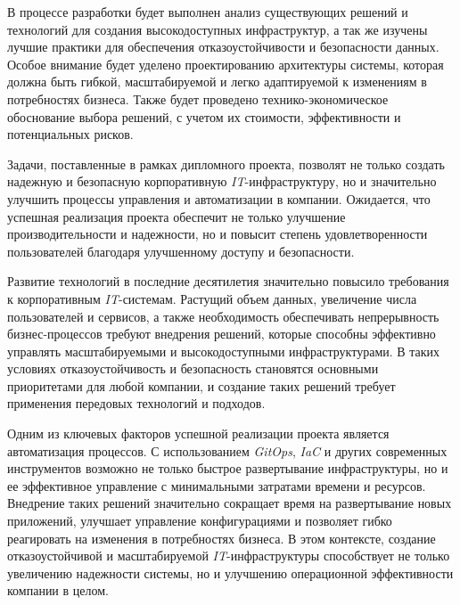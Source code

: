 В процессе разработки будет выполнен анализ существующих решений и технологий для создания высокодоступных инфраструктур, а так же изучены лучшие практики для обеспечения отказоустойчивости и безопасности данных. Особое внимание будет уделено проектированию архитектуры системы, которая должна быть гибкой, масштабируемой и легко адаптируемой к изменениям в потребностях бизнеса. Также будет проведено технико-экономическое обоснование выбора решений, с учетом их стоимости, эффективности и потенциальных рисков.

Задачи, поставленные в рамках дипломного проекта, позволят не только создать надежную и безопасную корпоративную \textit{IT}-инфраструктуру, но и значительно улучшить процессы управления и автоматизации в компании. Ожидается, что успешная реализация проекта обеспечит не только улучшение производительности и надежности, но и повысит степень удовлетворенности пользователей благодаря улучшенному доступу и безопасности.

Развитие технологий в последние десятилетия значительно повысило требования к корпоративным \textit{IT}-системам. Растущий объем данных, увеличение числа пользователей и сервисов, а также необходимость обеспечивать непрерывность бизнес-процессов требуют внедрения решений, которые способны эффективно управлять масштабируемыми и высокодоступными инфраструктурами. В таких условиях отказоустойчивость и безопасность становятся основными приоритетами для любой компании, и создание таких решений требует применения передовых технологий и подходов.

Одним из ключевых факторов успешной реализации проекта является автоматизация процессов. С использованием \textit{GitOps}, \textit{IaC} и других современных инструментов возможно не только быстрое развертывание инфраструктуры, но и ее эффективное управление с минимальными затратами времени и ресурсов. Внедрение таких решений значительно сокращает время на развертывание новых приложений, улучшает управление конфигурациями и позволяет гибко реагировать на изменения в потребностях бизнеса. В этом контексте, создание отказоустойчивой и масштабируемой \textit{IT}-инфраструктуры способствует не только увеличению надежности системы, но и улучшению операционной эффективности компании в целом.